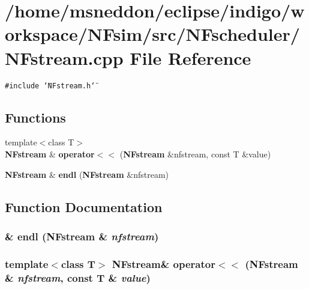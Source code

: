 \section{/home/msneddon/eclipse/indigo/workspace/NFsim/src/NFscheduler/NFstream.cpp File Reference}
\label{NFstream_8cpp}


{\tt \#include \char`\"{}NFstream.h\char`\"{}}\par
\subsection*{Functions}
\begin{CompactItemize}
\item 
{\footnotesize template$<$class T$>$ }\\{\bf NFstream} \& {\bf operator$<$$<$} ({\bf NFstream} \&nfstream, const T \&value)
\item 
{\bf NFstream} \& {\bf endl} ({\bf NFstream} \&nfstream)
\end{CompactItemize}


\subsection{Function Documentation}
\subsubsection{\& endl ({\bf NFstream} \& {\em nfstream})}\label{NFstream_8cpp_70d95b404a0185199948bf778584bdc3}


\subsubsection{\setlength{\rightskip}{0pt plus 5cm}template$<$class T$>$ {\bf NFstream}\& operator$<$$<$ ({\bf NFstream} \& {\em nfstream}, const T \& {\em value})\hspace{0.3cm}{\tt  [inline]}}\label{NFstream_8cpp_ef588953052314e1b69285568a59947f}


